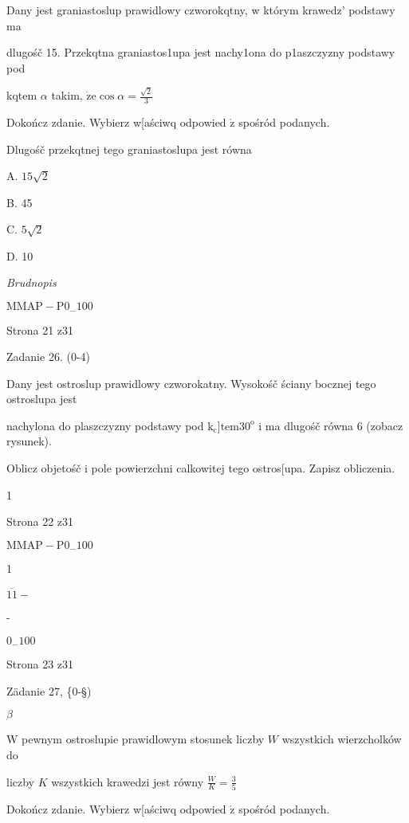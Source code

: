 \documentclass[a4paper,12pt]{article}
\begin{document}
Dany jest graniastoslup prawidlowy czworokqtny, w którym krawedz' podstawy ma

dlugośč 15. Przekqtna graniastos1upa jest nachy1ona do p1aszczyzny podstawy pod

kqtem $\alpha$ takim, $\dot{\mathrm{z}}\mathrm{e} \displaystyle \cos\alpha=\frac{\sqrt{2}}{3}$

Dokończ zdanie. Wybierz w[aściwq odpowied $\acute{\mathrm{z}}$ spośród podanych.

Dlugośč przekqtnej tego graniastoslupa jest równa

A. $15\sqrt{2}$

B. 45

C. $5\sqrt{2}$

D. 10

{\it Brudnopis}

$\mathrm{M}\mathrm{M}\mathrm{A}\mathrm{P}-\mathrm{P}0_{-}100$

Strona 21 z31





Zadanie 26. (0-4)

Dany jest ostroslup prawidlowy czworokatny. Wysokośč ściany bocznej tego ostroslupa jest

nachylona do plaszczyzny podstawy pod $\mathrm{k}_{\mathrm{c}}$]$\mathrm{t}\mathrm{e}\mathrm{m} 30^{\mathrm{o}}$ i ma dlugośč równa 6 (zobacz rysunek).

Oblicz objetośč i pole powierzchni calkowitej tego ostros[upa. Zapisz obliczenia.

1

Strona 22 z31

$\mathrm{M}\mathrm{M}\mathrm{A}\mathrm{P}-\mathrm{P}0_{-}100$





1

$\overline{11}-$

-

$0_{-}100$

Strona 23 z31





Zädanie 27, \{0-\S)

$\beta$

$\mathrm{W}$ pewnym ostroslupie prawidlowym stosunek liczby $W$ wszystkich wierzcholków do

liczby $K$ wszystkich krawedzi jest równy $\displaystyle \frac{W}{K}=\frac{3}{5}$

Dokończ zdanie. Wybierz w[aściwq odpowied $\acute{\mathrm{z}}$ spośród podanych.
\end{document}
